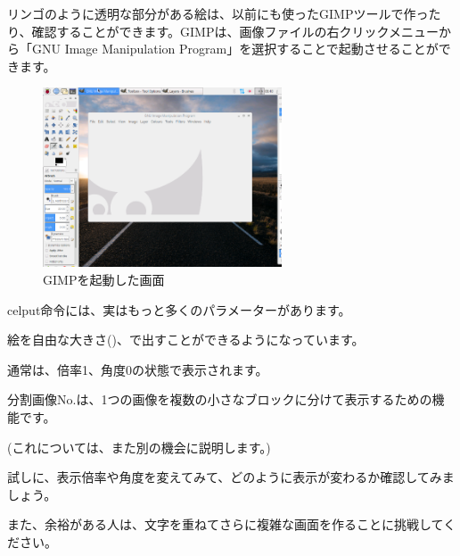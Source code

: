 リンゴのように透明な部分がある絵は、以前にも使ったGIMPツールで作ったり、確認することができます。GIMPは、画像ファイルの右クリックメニューから「GNU Image Manipulation Program」を選択することで起動させることができます。

\begin{figure}[H]
    \begin{center}
      \includegraphics[keepaspectratio,width=7.091cm,height=5.318cm]{text04-img/text04-img018.png}
      \caption{GIMPを起動した画面}
    \end{center}
    \label{fig:prog_menu}
\end{figure}

celput命令には、実はもっと多くのパラメーターがあります。



\begin{description}
    \item {}
\end{description}



\begin{description}
    \item {}
    \item {}
    \item {}
\end{description}

絵を自由な大きさ()、で出すことができるようになっています。

通常は、倍率1、角度0の状態で表示されます。

分割画像No.は、1つの画像を複数の小さなブロックに分けて表示するための機能です。

(これについては、また別の機会に説明します。)

試しに、表示倍率や角度を変えてみて、どのように表示が変わるか確認してみましょう。

また、余裕がある人は、文字を重ねてさらに複雑な画面を作ることに挑戦してください。








